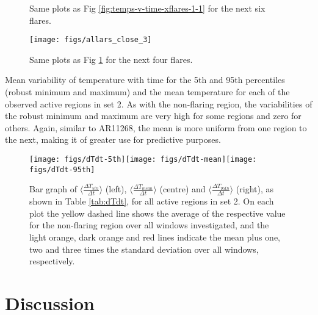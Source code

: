 \documentclass[namedreferences]{solarphysics}
\begin{document}
\begin{article}
\begin{figure}
\caption{Same plots as Fig \ref{fig:temps-v-time-xflares-1-1} for the next six flares.\label{fig:temps-v-time-xflares-1-2}}
\end{figure}

\begin{figure}
\begin{centering}
\texttt{[image: figs/allars\_close\_3]} 
\par\end{centering}

\caption{Same plots as Fig \ref{fig:temps-v-time-xflares-1-2} for the next four flares.\label{fig:temps-v-time-xflares-1-3}}
\end{figure}

\begin{table}
\caption{Mean variability of temperature with time for the 5th and 95th percentiles (robust minimum and maximum) and the mean temperature for each of the observed active regions in set 2.
As with the non-flaring region, the variabilities of the robust minimum and maximum are very high for some regions and zero for others.
Again, similar to AR11268, the mean is more uniform from one region to the next, making it of greater use for predictive purposes.\label{tab:dTdt}}
\end{table}

\begin{figure}
\begin{centering}
\texttt{[image: figs/dTdt-5th]}\texttt{[image: figs/dTdt-mean]}\texttt{[image: figs/dTdt-95th]}
\par\end{centering}

\caption{Bar graph of $\langle\frac{\Delta T_{5th}}{\Delta t}\rangle$ (left), $\langle\frac{\Delta T_{mean}}{\Delta t}\rangle$ (centre) and $\langle\frac{\Delta T_{95th}}{\Delta t}\rangle$ (right), as shown in Table \ref{tab:dTdt}, for all active regions in set 2.
On each plot the yellow dashed line shows the average of the respective value for the non-flaring region over all windows investigated, and the light orange, dark orange and red lines indicate the mean plus one, two and three times the standard deviation over all windows, respectively.\label{fig:Bar-graph-flaring}}
\end{figure}

\section{Discussion}


\end{article}
\end{document}
